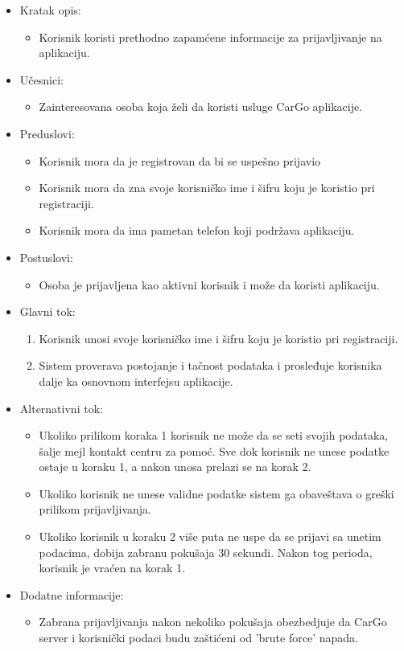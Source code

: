 \begin{itemize}
    \item Kratak opis:
        \begin{itemize}
            \item Korisnik koristi prethodno zapamćene informacije za prijavljivanje na aplikaciju.
        \end{itemize}
    \item Učesnici:
        \begin{itemize}
            \item Zainteresovana osoba koja želi da koristi usluge CarGo aplikacije.
        \end{itemize}
    \item Preduslovi:
        \begin{itemize}
            \item Korisnik mora da je registrovan da bi se uspešno prijavio
            \item Korisnik mora da zna svoje korisničko ime i šifru koju je koristio pri registraciji.
            \item Korisnik mora da ima pametan telefon koji podržava aplikaciju.
        \end{itemize}
    \item Postuslovi:
        \begin{itemize}
            \item Osoba je prijavljena kao aktivni korisnik i može da koristi aplikaciju.
        \end{itemize}
    \item Glavni tok:
        \begin{enumerate}
            \item Korisnik unosi svoje korisničko ime i šifru koju je koristio pri registraciji.
            \item Sistem proverava postojanje i tačnost podataka i prosleđuje korisnika dalje ka osnovnom interfejsu aplikacije.
        \end{enumerate}
    \item Alternativni tok:
        \begin{itemize}
            \item Ukoliko prilikom koraka 1 korisnik ne može da se seti svojih podataka, šalje mejl kontakt centru za pomoć. Sve dok korisnik ne unese podatke ostaje u koraku 1, a nakon unosa prelazi se na korak 2.
			\item Ukoliko korisnik ne unese validne podatke sistem ga obaveštava o greški prilikom prijavljivanja.
            \item Ukoliko korisnik u koraku 2 više puta ne uspe da se prijavi sa unetim podacima, dobija zabranu pokušaja 30 sekundi. Nakon tog perioda, korisnik je vraćen na korak 1.
        \end{itemize}
    \item Dodatne informacije:
        \begin{itemize}
            \item Zabrana prijavljivanja nakon nekoliko pokušaja obezbedjuje da CarGo server i korisnički podaci budu zaštićeni od 'brute force' napada.
        \end{itemize}
\end{itemize}

